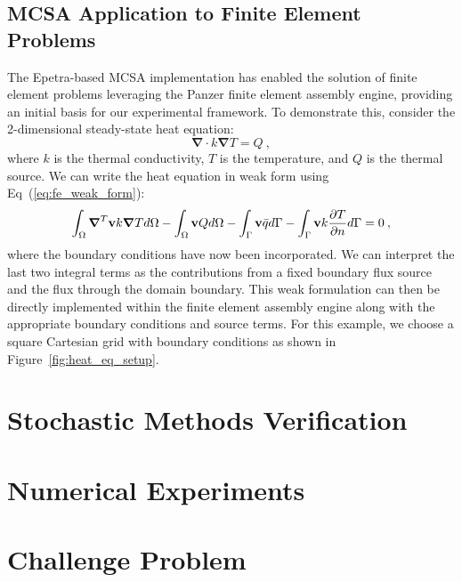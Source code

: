 \subsection{MCSA Application to Finite Element Problems}
\label{subsec:mcsa_finite_element}
The Epetra-based MCSA implementation has enabled the solution of
finite element problems leveraging the Panzer finite element assembly
engine, providing an initial basis for our experimental framework. To
demonstrate this, consider the 2-dimensional steady-state heat
equation:
\begin{equation}
  \boldsymbol{\nabla} \cdot k \boldsymbol{\nabla} T = Q\:,
  \label{eq:heat_equation}
\end{equation}
where $k$ is the thermal conductivity, $T$ is the temperature, and $Q$
is the thermal source. We can write the heat equation in weak form
using Eq~(\ref{eq:fe_weak_form}):
\begin{equation}
  \int_{\Omega} \boldsymbol{\nabla}^T \mathbf{v} k \boldsymbol{\nabla} T
  d\Omega - \int_{\Omega} \mathbf{v}Q d\Omega - \int_{\Gamma} \mathbf{v}
  \bar{q} d\Gamma - \int_{\Gamma} \mathbf{v} k \frac{\partial T}{\partial
    n} d\Gamma= 0\:,
  \label{eq:weak_heat_equation}
\end{equation}
where the boundary conditions have now been incorporated. We can
interpret the last two integral terms as the contributions from a
fixed boundary flux source and the flux through the domain
boundary. This weak formulation can then be directly implemented
within the finite element assembly engine along with the appropriate
boundary conditions and source terms. For this example, we choose a
square Cartesian grid with boundary conditions as shown in
Figure~\ref{fig:heat_eq_setup}.

\section{Stochastic Methods Verification}
\label{sec:method_verification}

\section{Numerical Experiments}
\label{sec:numerical_experiments}

\section{Challenge Problem}
\label{sec:challenge_problem}
